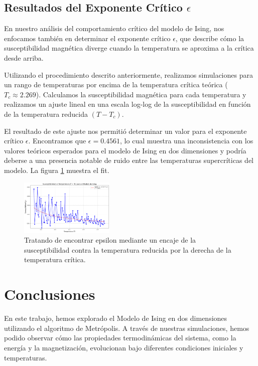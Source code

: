 \documentclass[twocolumn]{article}
\begin{document}
\subsection*{Resultados del Exponente Crítico $\epsilon$}

En nuestro análisis del comportamiento crítico del modelo de Ising, nos enfocamos también en determinar el exponente crítico $\epsilon$, que describe cómo la susceptibilidad magnética diverge cuando la temperatura se aproxima a la crítica desde arriba.

Utilizando el procedimiento descrito anteriormente, realizamos simulaciones para un rango de temperaturas por encima de la temperatura crítica teórica ($T_c \approx 2.269$). Calculamos la susceptibilidad magnética para cada temperatura y realizamos un ajuste lineal en una escala log-log de la susceptibilidad en función de la temperatura reducida $(T - T_c)$.

El resultado de este ajuste nos permitió determinar un valor para el exponente crítico $\epsilon$. Encontramos que $\epsilon = 0.4561$, lo cual muestra una inconsistencia  con los valores teóricos esperados para el modelo de Ising en dos dimensiones y podría deberse a una presencia notable de ruido entre las temperaturas supercríticas del modelo. La figura \ref{fig:epsilon}  muestra el fit.

\begin{figure}[hbt]
    \centering
    \includegraphics[width=0.4\textwidth]{figures/epsilon.png}
    \caption{Tratando de encontrar epsilon mediante un encaje de la susceptibilidad contra la temperatura reducida por la derecha de la temperatura crítica.}
    \label{fig:epsilon}
\end{figure}

\section{Conclusiones}

En este trabajo, hemos explorado el Modelo de Ising en dos dimensiones utilizando el algoritmo de Metrópolis. A través de nuestras simulaciones, hemos podido observar cómo las propiedades termodinámicas del sistema, como la energía y la magnetización, evolucionan bajo diferentes condiciones iniciales y temperaturas.
\end{document}
